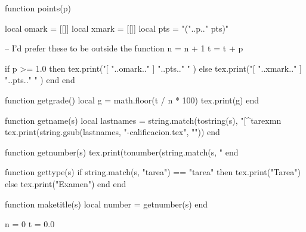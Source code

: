 \usepackage[a4paper, top=2cm]{geometry}
\usepackage{pifont}
\usepackage{xfp}
\usepackage[dvipsnames]{xcolor}
\usepackage{titlesec}
\usepackage[most]{tcolorbox}
\usepackage{csvsimple}
\usepackage{luacode}



\begin{luacode*}

    function points(p)

        local omark = [[{\color{OliveGreen}}]]
        local xmark = [[{\color{Bittersweet}}]]
        local pts = "("..p.." pts)"

        -- I'd prefer these to be outside the function
        n = n + 1
        t = t + p

        if p >= 1.0 then
            tex.print("[ "..omark.." ] "..pts.." " )
        else
            tex.print("[ "..xmark.." ] "..pts.." " )
        end
    end

    function getgrade()
        local g = math.floor(t / n * 100)
        tex.print(g)
    end

    function getname(s)
        local lastnames = string.match(tostring(s), "[^tarexmn%
        tex.print(string.gsub(lastnames, "-calificacion.tex", ""))
    end

    function getnumber(s)
        tex.print(tonumber(string.match(s, "%
    end

    function gettype(s)
        if string.match(s, "tarea") == "tarea" then
            tex.print("Tarea")
        else
            tex.print("Examen")
        end
    end

    function maketitle(s)
        local number = getnumber(s)
    end

    n = 0
    t = 0.0

\end{luacode*}


\newcommand{\point}[1]{\item\textbf{\directlua{points(#1)}}}

\newcommand{\gettitle}{
    \directlua{
        gettype(\luastring\jobname)
        getnumber(\luastring\jobname)
    }
    de Heurística 
}

\newcommand{\getauthor}{
    \csvreader[no head, filter equal={\csvcolii}{\directlua{getname(\luastring\jobname)}}]{./students-list.csv}{}{\csvcoli}
}

\newcommand{\getgrade}{\directlua{getgrade()} de 100}

\newcommand{\prettyauthor}[1]{\flushright{\textit{--- #1}}}
